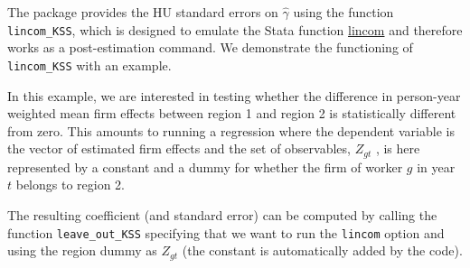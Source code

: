 \documentclass[11pt]{article}
\begin{document}
The package provides the HU standard errors on \(\hat{\gamma}\)
using the function \texttt{lincom\_KSS}, which is designed to emulate the Stata
function \href{https://www.stata.com/manuals13/rlincom.pdf}{lincom} and therefore works as a post-estimation
command. We demonstrate the functioning of \texttt{lincom\_KSS} with an
example.

In this example, we are interested in testing whether the difference in
person-year weighted mean firm effects between region 1 and region 2 is
statistically different from zero. This amounts to running a regression
where the dependent variable is the vector of estimated firm effects and
the set of observables, \(Z_{gt}\) , is here represented by a constant
and a dummy for whether the firm of worker \(g\) in year \(t\) belongs
to region 2.

The resulting coefficient (and standard error) can be computed by
calling the function \texttt{leave\_out\_KSS} specifying that we want to
run the \texttt{lincom} option and using the region dummy as \(Z_{gt}\)
(the constant is automatically added by the code).
\end{document}

